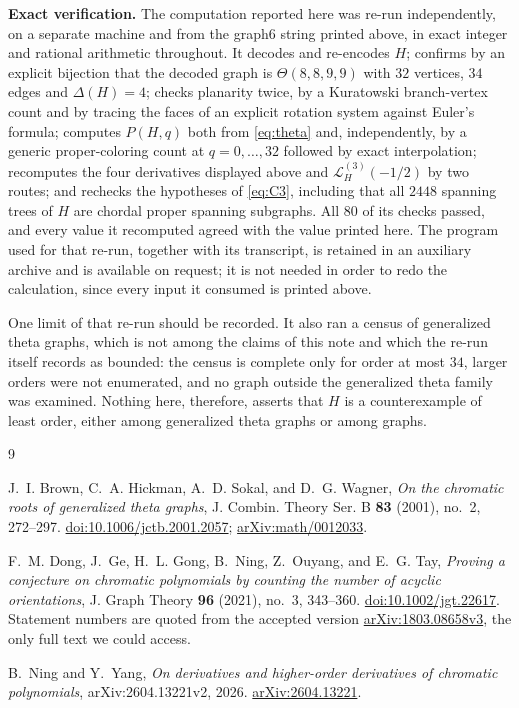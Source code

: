 \documentclass[11pt]{amsart}
\theoremstyle{remark}
\newcommand{\Lfun}{\mathcal L}
\newcommand{\ThetaG}{\Theta}
\begin{document}
\medskip
\noindent\textbf{Exact verification.}
The computation reported here was re-run independently, on a separate machine
and from the graph6 string printed above, in exact integer and rational
arithmetic throughout. It decodes and re-encodes
$H$; confirms by an explicit bijection that the decoded graph is
$\ThetaG(8,8,9,9)$ with $32$ vertices, $34$ edges and $\Delta(H)=4$; checks
planarity twice, by a Kuratowski branch-vertex count and by tracing the faces
of an explicit rotation system against Euler's formula; computes $P(H,q)$ both
from \eqref{eq:theta} and, independently, by a generic proper-coloring count at
$q=0,\ldots,32$ followed by exact interpolation; recomputes the four
derivatives displayed above and $\Lfun_H^{(3)}(-1/2)$ by two routes; and
rechecks the hypotheses of \eqref{eq:C3}, including that all $2448$ spanning
trees of $H$ are chordal proper spanning subgraphs. All $80$ of its checks
passed, and every value it recomputed agreed with the value printed here. The
program used for that re-run, together with its transcript, is retained in an
auxiliary archive and is available on request; it is not needed in order to
redo the calculation, since every input it consumed is printed above.

One limit of that re-run should be recorded. It also ran a census of
generalized theta graphs, which is not among the claims of this note and which
the re-run itself records as bounded: the census is complete only for order at
most $34$, larger orders were not enumerated, and no graph outside the generalized
theta family was examined. Nothing here, therefore, asserts that $H$ is a
counterexample of least order, either among generalized theta graphs or among
graphs.

\begin{thebibliography}{9}

J.~I. Brown, C.~A. Hickman, A.~D. Sokal, and D.~G. Wagner,
\emph{On the chromatic roots of generalized theta graphs},
J. Combin. Theory Ser. B \textbf{83} (2001), no.~2, 272--297.
\href{https://doi.org/10.1006/jctb.2001.2057}{doi:10.1006/jctb.2001.2057};
\href{https://arxiv.org/abs/math/0012033}{arXiv:math/0012033}.

F.~M. Dong, J.~Ge, H.~L. Gong, B.~Ning, Z.~Ouyang, and E.~G. Tay,
\emph{Proving a conjecture on chromatic polynomials by counting the number of
acyclic orientations},
J. Graph Theory \textbf{96} (2021), no.~3, 343--360.
\href{https://doi.org/10.1002/jgt.22617}{doi:10.1002/jgt.22617}.
Statement numbers are quoted from the accepted version
\href{https://arxiv.org/abs/1803.08658v3}{arXiv:1803.08658v3}, the only full
text we could access.

B.~Ning and Y.~Yang,
\emph{On derivatives and higher-order derivatives of chromatic polynomials},
arXiv:2604.13221v2, 2026.
\href{https://arxiv.org/abs/2604.13221}{arXiv:2604.13221}.

\end{thebibliography}
\end{document}
